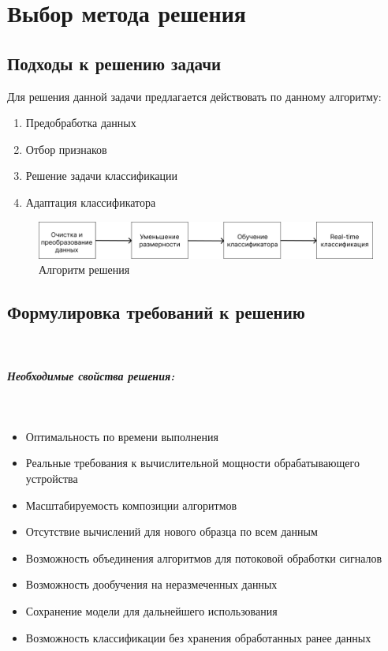 \chapter{Выбор метода решения}
\label{chap:methods}
    \section{Подходы к решению задачи}
    \par
        Для решения данной задачи предлагается действовать по данному алгоритму:
        \noindent
        \begin{enumerate}
            \item Предобработка данных
            \item Отбор признаков
            \item Решение задачи классификации
            \item Адаптация классификатора
        \end{enumerate}
        
        \begin{figure}[h!]
                \centering
                \includegraphics[scale=0.7]{pictures/logic.png}
                \caption{Алгоритм решения}
                \label{fig:my_label}
            \end{figure} 
    \newpage
    \section{Формулировка требований к решению} \\
        \paragraph{Необходимые свойства решения:}
         \\
        \begin{itemize}
            \item Оптимальность по времени выполнения
            \item Реальные требования к вычислительной мощности обрабатывающего устройства
            \item Масштабируемость композиции алгоритмов
            \item Отсутствие вычислений для нового образца по всем данным
            \item Возможность объединения алгоритмов для потоковой обработки сигналов
            \item Возможность дообучения на неразмеченных данных
            \item Сохранение модели для дальнейшего использования
            \item Возможность классификации без хранения обработанных ранее данных \\ \\
        \end{itemize}
        
